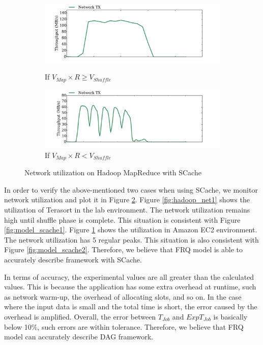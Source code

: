 {\begin{figure}
	\centering
	\begin{minipage}[hb]{\linewidth}
		\begin{subfigure}{\linewidth}
			\begin{minipage}{\linewidth}
				\includegraphics[width=\linewidth]{fig/hadoop_net1}
				\caption{\color{blue}If \(V_{Map} \times R \ge V_{Shuffle}\)}
				\label{fig:hadoop_net1}
			\end{minipage}
			\begin{minipage}{\linewidth}
				\includegraphics[width=\linewidth]{fig/hadoop_net2}
				\caption{\color{blue}If \(V_{Map} \times R < V_{Shuffle}\)}
				\label{fig:hadoop_net2}
			\end{minipage}
		\end{subfigure}
		\caption{\color{blue}Network utilization on Hadoop MapReduce with SCache}
		\label{fig:hadoop_net}
	\end{minipage}
\end{figure}

In order to verify the above-mentioned two cases when using SCache, we monitor network utilization and plot it in Figure \ref{fig:hadoop_net}. Figure \ref{fig:hadoop_net1} shows the utilization of Terasort in the lab environment. The network utilization remains high until shuffle phase is complete. This situation is consistent with Figure \ref{fig:model_scache1}. Figure \ref{fig:hadoop_net2} shows the utilization in Amazon EC2 environment. 
The network utilization has 5 regular peaks. This situation is also consistent with Figure \ref{fig:model_scache2}. Therefore, we believe that FRQ model is able to accurately describe framework with SCache.

In terms of accuracy, the experimental values are all greater than the calculated values. This is because the application has some extra overhead at runtime, such as network warm-up, the overhead of allocating slots, and so on. In the case where the input data is small and the total time is short, the error caused by the overhead is amplified. Overall, the error between \(T_{Job}\) and \(ExpT_{Job}\) is basically below 10\%, such errors are within tolerance. Therefore, we believe that FRQ model can accurately describe DAG framework.
}
